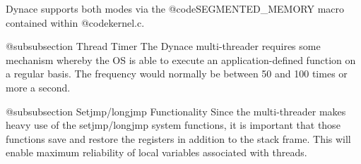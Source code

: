 Dynace supports both modes via the @code{SEGMENTED_MEMORY} macro
contained within @code{kernel.c}.


@subsubsection Thread Timer
The Dynace multi-threader requires some mechanism whereby the OS
is able to execute an application-defined function on a regular
basis.  The frequency would normally be between 50 and 100 times or
more a second.

@subsubsection Setjmp/longjmp Functionality
Since the multi-threader makes heavy use of the setjmp/longjmp
system functions, it is important that those functions save and
restore the registers in addition to the stack frame.  This will
enable maximum reliability of local variables associated with
threads.

